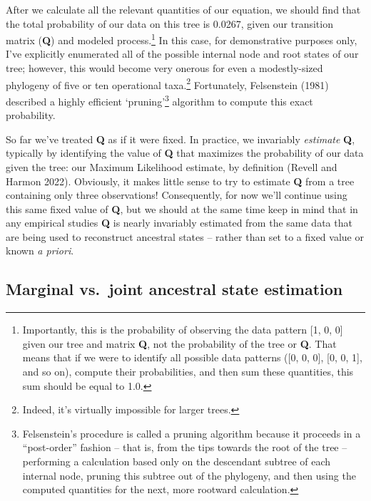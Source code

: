 \documentclass{article}
\begin{document}
After we calculate all the relevant quantities of our equation, we should find that the total probability of our data on this tree is 0.0267, given our transition matrix (\textbf{Q}) and modeled process.\footnote{Importantly, this is the probability of observing the data pattern [1, 0, 0] given our tree and matrix \textbf{Q}, not the probability of the tree or \textbf{Q}. That means that if we were to identify all possible data patterns ([0, 0, 0], [0, 0, 1], and so on), compute their probabilities, and then sum these quantities, this sum should be equal to 1.0.} In this case, for demonstrative purposes only, I've explicitly enumerated all of the possible internal node and root states of our tree; however, this would become very onerous for even a modestly-sized phylogeny of five or ten operational taxa.\footnote{Indeed, it's virtually impossible for larger trees.} Fortunately, Felsenstein (1981) described a highly efficient `pruning'\footnote{Felsenstein's procedure is called a pruning algorithm because it proceeds in a ``post-order'' fashion -- that is, from the tips towards the root of the tree -- performing a calculation based only on the descendant subtree of each internal node, pruning this subtree out of the phylogeny, and then using the computed quantities for the next, more rootward calculation.} algorithm to compute this exact probability.

So far we've treated \textbf{Q} as if it were fixed. In practice, we invariably \emph{estimate} \textbf{Q}, typically by identifying the value of \textbf{Q} that maximizes the probability of our data given the tree: our Maximum Likelihood estimate, by definition (Revell and Harmon 2022). Obviously, it makes little sense to try to estimate \textbf{Q} from a tree containing only three observations! Consequently, for now we'll continue using this same fixed value of \textbf{Q}, but we should at the same time keep in mind that in any empirical studies \textbf{Q} is nearly invariably estimated from the same data that are being used to reconstruct ancestral states -- rather than set to a fixed value or known \emph{a priori}.

\subsection{Marginal vs.~joint ancestral state estimation}\label{marginal-vs.-joint-ancestral-state-estimation}
\end{document}
